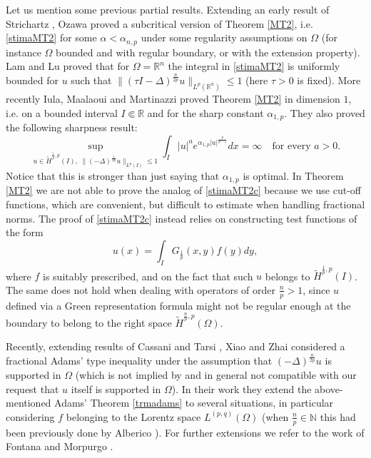 \documentclass[11pt, a4paper]{article}
\newcommand{\R}{\mathbb{R}}
\begin{document}
\medskip

Let us mention some previous partial results. Extending an early result of Strichartz \cite{str}, Ozawa \cite{oza} proved a subcritical version of Theorem \ref{MT2}, i.e. \eqref{stimaMT2} for some $\alpha<\alpha_{n,p}$ under some regularity assumptions on $\Omega$ (for instance $\Omega$ bounded and with regular boundary, or with the extension property). Lam and Lu \cite{LaL} proved that for $\Omega=\R^n$ the integral in \eqref{stimaMT2} is uniformly bounded for $u$ such that $\|(\tau I-\Delta)^\frac{n}{2p}u\|_{L^p(\R^n)}\le 1$ (here $\tau>0$ is fixed). More recently Iula, Maalaoui and Martinazzi \cite{IMM} proved Theorem \ref{MT2} in dimension $1$, i.e. on a bounded interval $I\Subset \R$ and for the sharp constant $\alpha_{1,p}$. They also proved the following sharpness result:
\begin{equation}\label{stimaMT2c}
\sup_{u\in \tilde H^{\frac{1}{p},p}(I), \;\|(-\Delta)^{\frac{1}{2p}}u\|_{L^{p}(I)}\leq 1}\int_{I}|u|^a e^{\alpha_{1,p} |u|^\frac{p}{p-1}}dx =\infty\quad \text{for every }a>0.
\end{equation}
Notice that this is stronger than just saying that $\alpha_{1,p}$ is optimal. In Theorem \ref{MT2} we are not able to prove the analog of \eqref{stimaMT2c} because we use cut-off functions, which are convenient, but difficult to estimate when handling fractional norms. The proof of \eqref{stimaMT2c} instead relies on constructing test functions of the form
$$u(x)=\int_I G_{\frac 1p}(x,y) f(y)dy,$$
where $f$ is suitably prescribed, and on the fact that such $u$ belongs to $\tilde H^{\frac 1p,p}(I)$. The same does not hold when dealing with operators of order $\frac np>1$, since $u$ defined via a Green representation formula might not be regular enough at the boundary to belong to the right space $\tilde H^{\frac{n}{p},p}(\Omega)$.

\medskip

Recently, extending results of Cassani and Tarsi \cite{CT}, Xiao and Zhai \cite{XZ} considered a fractional Adams' type inequality under the assumption that $(-\Delta)^\frac{n}{2p} u$ is supported in $\Omega$ (which is not implied by and in general not compatible with our request that $u$ itself is supported in $\Omega$). In their work they extend the above-mentioned Adams' Theorem \ref{trmadams} to several situations, in particular considering $f$ belonging to the Lorentz space $L^{(p,q)}(\Omega)$ (when $\frac{n}{p}\in \mathbb{N}$ this had been previously done by Alberico \cite{Alb}). For further extensions we refer to the work of Fontana and Morpurgo \cite{FM}.
\end{document}
